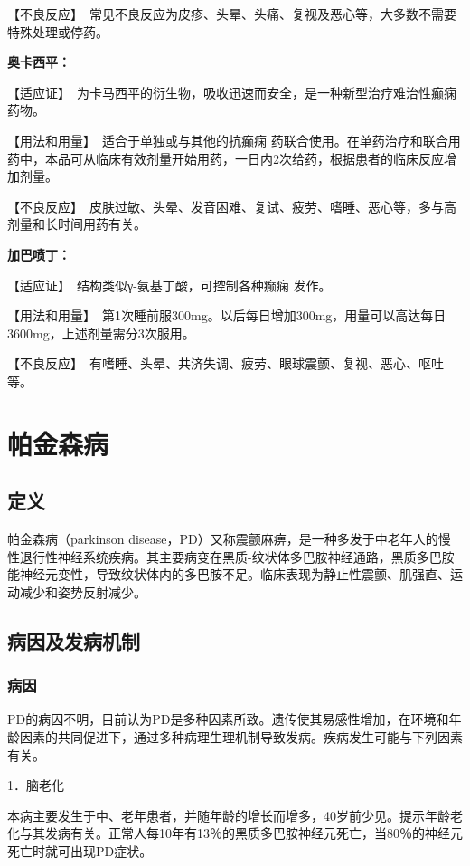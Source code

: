 【不良反应】　常见不良反应为皮疹、头晕、头痛、复视及恶心等，大多数不需要特殊处理或停药。

\textbf{奥卡西平：}

【适应证】　为卡马西平的衍生物，吸收迅速而安全，是一种新型治疗难治性癫痫
药物。

【用法和用量】　适合于单独或与其他的抗癫痫
药联合使用。在单药治疗和联合用药中，本品可从临床有效剂量开始用药，一日内2次给药，根据患者的临床反应增加剂量。

【不良反应】　皮肤过敏、头晕、发音困难、复试、疲劳、嗜睡、恶心等，多与高剂量和长时间用药有关。

\textbf{加巴喷丁：}

【适应证】　结构类似γ-氨基丁酸，可控制各种癫痫
发作。

【用法和用量】　第1次睡前服300mg。以后每日增加300mg，用量可以高达每日3600mg，上述剂量需分3次服用。

【不良反应】　有嗜睡、头晕、共济失调、疲劳、眼球震颤、复视、恶心、呕吐等。

\section{帕金森病}

\subsection{定义}

帕金森病（parkinson
disease，PD）又称震颤麻痹，是一种多发于中老年人的慢性退行性神经系统疾病。其主要病变在黑质-纹状体多巴胺神经通路，黑质多巴胺能神经元变性，导致纹状体内的多巴胺不足。临床表现为静止性震颤、肌强直、运动减少和姿势反射减少。

\subsection{病因及发病机制}

\subsubsection{病因}

PD的病因不明，目前认为PD是多种因素所致。遗传使其易感性增加，在环境和年龄因素的共同促进下，通过多种病理生理机制导致发病。疾病发生可能与下列因素有关。

1．脑老化

本病主要发生于中、老年患者，并随年龄的增长而增多，40岁前少见。提示年龄老化与其发病有关。正常人每10年有13％的黑质多巴胺神经元死亡，当80％的神经元死亡时就可出现PD症状。

